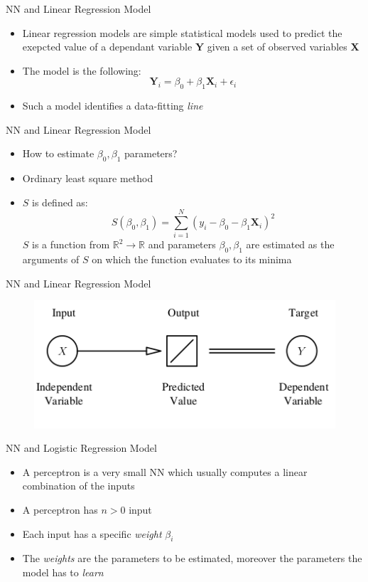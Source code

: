 \documentclass[xcolor ={table,usenames,dvipsnames}]{beamer}
\theoremstyle{definition}
\begin{document}
\begin{frame}{NN and Linear Regression Model}
\begin{itemize}
	\item Linear regression models are simple statistical models used to predict the exepcted value of a dependant variable \textbf{Y} given a set of observed variables \textbf{X}
	\item The model is the following:
	$$
	\textbf{Y}_i = \beta_0 + \beta_1 \textbf{X}_i + \epsilon_i
	$$
	\item Such a model identifies a data-fitting \emph{line} 
\end{itemize}
\end{frame}
\begin{frame}{NN and Linear Regression Model}
\begin{itemize}
	\item How to estimate $\beta_0,\beta_1$ parameters?
	\item \color{red} Ordinary least square \color{black} method
	\item $S$ is defined as:
	$$
	S(\beta_0,\beta_1) = \sum_{i=1}^N (y_i - \beta_0 - \beta_1 \textbf{X}_i)^2
	$$
	$S$ is a function from $\mathbb{R}^2 \rightarrow \mathbb{R}$ and parameters $\beta_0,\beta_1$ are estimated  as the arguments of $S$ on which the function evaluates to its minima
\end{itemize}
\end{frame}
\begin{frame}{NN and Linear Regression Model}
	\begin{figure}[h!]
	\centering
	\includegraphics[scale=2.5]{../Relazione/img/linreg}
\end{figure}
\end{frame}
\begin{frame}{NN and Logistic Regression Model}
\begin{itemize}
	\item A perceptron is a very small NN which usually computes a linear combination of the inputs
	\item A perceptron has $n>0$ input
	\item Each input has a specific \emph{weight} $\beta_i$
	\item The \emph{weights} are the parameters to be estimated, moreover the parameters the model has to \emph{learn}
\end{itemize}
\end{frame}
\end{document}

